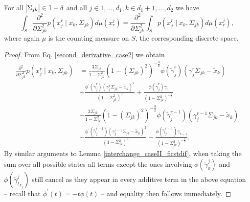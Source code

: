 \begin{corollary}
    For all $\abs{\Sigma_{jk}} \in 1-\delta$ and all $j \in 1, \dots, d_1, k\in d_1 +1, \dots, d_2$ we have
    \begin{equation*}
        \int_S \frac{\partial^2 }{\partial \Sigma_{jk}^2} p(x_j^{r} \mid x_{k}, \Sigma_{jk}) d\mu(x_r^j)= \frac{\partial^2}{\partial \Sigma_{jk}^2} \int_S p(x_j^{r} \mid x_{k}, \Sigma_{jk}) d\mu(x_r^j),
    \end{equation*}
    where again $\mu$ is the counting measure on $S$, the corresponding discrete space.
    
    \begin{proof}
        From Eq. \eqref{second_derivative_case2} we obtain 
        \begin{equation*}
            \begin{split}
                \frac{\partial^2 }{\partial \Sigma_{jk}^2} p(x_j^{r} \mid x_{k}, \Sigma_{jk}) 
                &= \frac{3\Sigma_{jk}}{1-\Sigma_{jk}^2} (1-(\Sigma_{jk})^2)^{-\frac{3}{2}} \phi({\tilde{\gamma}}_j^{r})({\gamma}_j^r\Sigma_{jk} - {\tilde{x}}_{k}) \\
                &+\frac{\phi^\prime({\tilde{\gamma}}_j^{r})({\gamma}_j^r\Sigma_{jk} - {\tilde{x}}_{k})^2}{(1-\Sigma_{jk}^2)^3} + \frac{\phi({\tilde{\gamma}}_j^{r}){\gamma}_{r}}{(1-\Sigma_{jk}^2)^{-\frac{3}{2}}} \\
                &- \frac{3\Sigma_{jk}}{1-\Sigma_{jk}^2} (1-(\Sigma_{jk})^2)^{-\frac{3}{2}} \phi({\tilde{\gamma}}_j^{r-1})({\gamma}_j^{r-1}\Sigma_{jk} - {\tilde{x}}_{k}) \\
                &- \frac{\phi^\prime({\tilde{\gamma}}_j^{r-1})({\gamma}_j^{r-1}\Sigma_{jk} - {\tilde{x}}_{k})^2}{(1-\Sigma_{jk}^2)^3} - \frac{\phi({\tilde{\gamma}}_j^{r-1}){\gamma}_{r-1}}{(1-\Sigma_{jk}^2)^{-\frac{3}{2}}}.
            \end{split}
        \end{equation*}
        By similar arguments to Lemma \ref{interchange_caseII_firstdif}, when taking the sum over all possible states all terms except the ones involving $\phi({\tilde{\gamma}}^j_{0})$ and $\phi({\tilde{\gamma}}^j_{l_{X_j}})$ still cancel as they appear in every additive term in the above equation -- recall that $\phi^\prime(t) = -t\phi(t)$ -- and equality then follows immediately. 
    \end{proof}
\end{corollary}    



